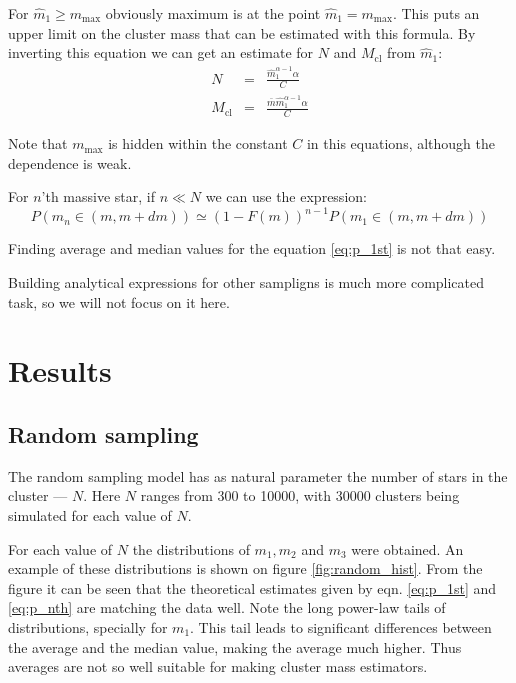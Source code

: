 \documentclass{aastex}
\newcommand{\Mmax}{m_{\mathrm{max}}}
\newcommand{\Mcl}{M_{\mathrm{cl}}}
\begin{document}
For $\hat{m}_1 \geq \Mmax$ obviously maximum is at the point $\hat{m}_1 = \Mmax$. 
This puts an upper limit on the cluster mass that can be estimated with this formula.
By inverting this equation we can get an estimate for $N$ and $\Mcl$ from $\hat{m}_1$:
\begin{eqnarray}
  N &=& \frac{\hat{m}_1^{\alpha-1} \alpha}{C} \nonumber \\ 
  \Mcl &=& \frac{\bar{m} \hat{m}_1^{\alpha-1} \alpha}{C} \label{eq:mhat_est}
\end{eqnarray} 

Note that $\Mmax$ is hidden within the constant $C$ in this equations, although the dependence is weak.

For $n$'th massive star, if $n \ll N$ we can use the expression:
\begin{equation}\label{eq:p_nth}
 P(m_n \in (m, m+dm)) \simeq \left( 1 - F(m) \right)^{n-1} P(m_1 \in (m, m+dm))
\end{equation} 

Finding average and median values for the equation \ref{eq:p_1st} is not that easy.

Building analytical expressions for other sampligns is much more complicated task, so we will not focus on it here.
% 
% 

\section{Results}
\subsection{Random sampling}\label{sec:random}
The random sampling model has as natural parameter the number of stars in the cluster --- $N$. Here $N$ ranges from 300 to 10000, with 30000 clusters being simulated for each value of $N$.

For each value of $N$ the distributions of $m_1, m_2$ and $m_3$ were obtained. An example of these distributions is shown on figure \ref{fig:random_hist}. From the figure it can be seen that the theoretical estimates given by eqn. \ref{eq:p_1st} and \ref{eq:p_nth} are matching the data well.
Note the long power-law tails of distributions, specially for $m_1$. This tail leads to significant differences between the average and the median value, making the average much higher. Thus averages are not so well suitable for making cluster mass estimators.
\end{document}
